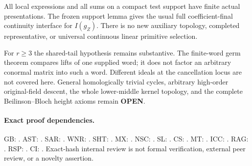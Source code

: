 All local expressions and all sums on a compact test support have
finite actual presentations.  The frozen support lemma gives the
usual full coefficient-final continuity interface for $I(g_Z)$.
There is no new auxiliary topology, completed representative,
or universal continuous linear primitive selection.

For $r\ge3$ the shared-tail hypothesis remains substantive.
The finite-word germ theorem compares lifts of one supplied word;
it does not factor an arbitrary conormal matrix into such a word.
Different ideals at the cancellation locus are not covered here.
General homologically trivial cycles, arbitrary high-order
original-field descent, the whole lower-middle kernel topology,
and the complete Beilinson--Bloch height axioms remain \textbf{OPEN}.

\paragraph{Exact proof dependencies.}
GB: .
AST: .
SAR: .
WNR: .
SHT: .
MX: .
NSC: .
SL: .
CS: .
MT: .
ICC: .
RAG: .
RSP: .
CI: .
Exact-hash internal review is not formal verification, external
peer review, or a novelty assertion.

